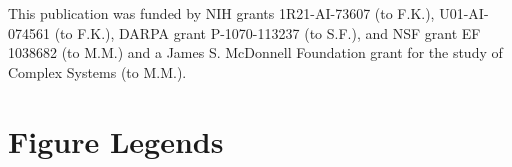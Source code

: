 \documentclass[10pt]{article}
\begin{document}
This publication was funded by NIH grants 1R21-AI-73607 (to F.K.), U01-AI-074561 (to F.K.), DARPA grant P-1070-113237 (to S.F.), and NSF grant EF 1038682 (to M.M.) and a James S. McDonnell Foundation grant for the study of Complex Systems (to M.M.).





\pagebreak

\section*{Figure Legends}
\end{document}
